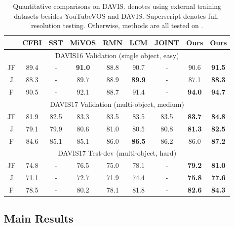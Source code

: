 \documentclass[letterpaper]{article} \usepackage{aaai22}  \usepackage{times}  \usepackage{helvet}  \usepackage{courier}  \usepackage[hyphens]{url}  \usepackage{graphicx} \urlstyle{rm} \def\UrlFont{\rm}  \usepackage{natbib}  \usepackage{caption} \DeclareCaptionStyle{ruled}{labelfont=normalfont,labelsep=colon,strut=off} \frenchspacing  \setlength{\pdfpagewidth}{8.5in}  \setlength{\pdfpageheight}{11in}  \usepackage{algorithm}
\begin{document}
 \begin{table}
	\centering
	\caption{Quantitative comparisons on DAVIS.  denotes using external training datasets besides YouTubeVOS and DAVIS. Superscript  denotes full-resolution testing. Otherwise, methods are all tested on . }
	\setlength{\tabcolsep}{1.0mm}
	\begin{small}
	\resizebox{0.48\textwidth}{!}
	{
    \begin{tabular}{c|ccccccc|c}
    \toprule
           & CFBI & SST & MiVOS & RMN & LCM  & JOINT & \textbf{Ours} & \textbf{Ours}\\ \midrule
         \multicolumn{9}{c}{DAVIS16 Validation (single object, easy)}                                    \\
		\midrule
        JF   & 89.4   & - & \textbf{91.0}      & 88.8& 90.7 & - & 90.6 & \textbf{91.5}  \\ 
        J     & 88.3    & - & {89.7} & 88.9 &\textbf{89.9} & - & 87.1 & \textbf{88.3}  \\ 
        F    & 90.5    & - & 92.1         & 88.7  &91.4& - &\textbf{94.0}& \textbf{94.7} \\ 
        \midrule
         \multicolumn{9}{c}{DAVIS17 Validation (multi-object, medium)}                                    \\
		\midrule
        JF   & 81.9   & 82.5 & 83.3 & 83.5 & 83.5 & 83.5 & \textbf{83.7} & \textbf{84.8}  \\ 
        J     & 79.1    & 79.9 & 80.6 & 81.0 & 80.5 & 80.8 & \textbf{81.3} & \textbf{82.5}  \\ 
        F    & 84.6    & 85.1 & 85.1 & 86.0 & \textbf{86.5} & 86.2 & {86.0} & \textbf{87.2} \\ 
        \midrule
         \multicolumn{9}{c}{DAVIS17 Test-dev (multi-object, hard)}                                    \\
		\midrule
        JF   & 74.8     & -  & 76.5 & 75.0  & 78.1 & - & \textbf{79.2} & \textbf{81.0} \\ 
        J     & 71.1     & - & 72.7  & 71.9 & 74.4 & - & \textbf{75.8}  &  \textbf{77.6}\\ 
        F     & 78.5    & - & 80.2  & 78.1 & 81.8 & - & \textbf{82.6}  & \textbf{84.3}\\         
        
        \bottomrule
    \end{tabular}
    }
    \end{small}
    \label{table:dv}
\end{table} \subsection{Main Results}
\end{document}

